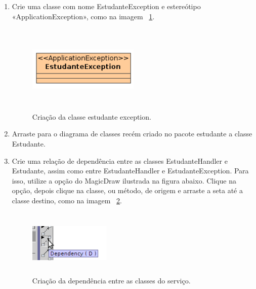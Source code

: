 \begin{enumerate}
\item Crie uma classe com nome EstudanteException e estereótipo
«ApplicationException», como na imagem ~\ref{cria_estudante_exception}.
\begin{figure}[!htb]
	\centering
	\includegraphics[width=150pt,height=120pt]{imgs/tutorial-mdarte-0010.png}
	\caption{Criação da classe estudante exception.}
	\label{cria_estudante_exception}
\end{figure}
	
\item Arraste para o diagrama de classes recém criado no pacote estudante a classe Estudante.
	
\item Crie uma relação de dependência entre as classes EstudanteHandler e
Estudante, assim como entre EstudanteHandler e EstudanteException. Para isso,
utilize a opção do MagicDraw ilustrada na figura abaixo. Clique na opção, depois
clique na classe, ou método, de origem e arraste a seta até a classe destino,
como na imagem ~\ref{cria_dependencia_servico}.

\begin{figure}[!htb]
	\centering
	\includegraphics[width=110pt,height=90pt]{imgs/tutorial-mdarte-0012.png}
	\caption{Criação da dependência entre as classes do serviço.}
	\label{cria_dependencia_servico}
\end{figure}


\end{enumerate}
